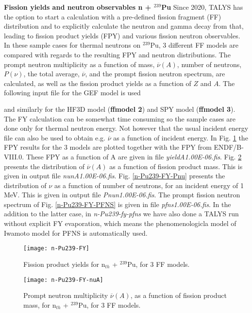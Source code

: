 \begin{samplecase}
{\bf Fission yields and neutron observables n + ${}^{239}$Pu}\newline
Since 2020, TALYS has the option to start a calculation with a pre-defined fission fragment (FF) distribution and to explicitly 
calculate the neutron and gamma decay from that, leading to fission product yields (FPY) and various fission neutron observables. 
In these sample cases for thermal neutrons on ${}^{239}$Pu, 3 different FF models are compared with regards to the resulting 
FPY and neutron distributions. The prompt neutron multiplicity as a function of mass, 
$\overline{\nu}(A)$, number of neutrons, $P({\nu})$, the total average,
$\overline{\nu}$, and the prompt fission neutron spectrum,
are calculated, as well as the fission product yields as a 
function of $Z$ and $A$.
The following input file for the GEF model is used


and similarly for the HF3D model ({\bf ffmodel 2}) and SPY model ({\bf ffmodel 3}).
The FY calculation can be somewhat time consuming so the sample cases are done only for thermal neutron energy. Not however that the usual incident energy file can also be used to obtain e.g. $\overline{\nu}$ as a function of incident energy.
In Fig. \ref{n-Pu239-FY} the FPY results for the 3 models are plotted together with the FPY from ENDF/B-VIII.0. These FPY as a function of A are given in file {\it yieldA1.00E-06.fis}.
Fig. \ref{n-Pu239-FY-nuA} presents the distribution of $\overline{\nu}(A)$ as a function of fission product mass. This is given in output 
file {\it nunA1.00E-06.fis}.
Fig. \ref{n-Pu239-FY-Pnu} presents the distribution of $\nu$ as a function of number of neutrons, for an incident energy of 1 MeV. This is given in output 
file {\it Pnun1.00E-06.fis}.
The prompt fission neutron spectrum of Fig. \ref{n-Pu239-FY-PFNS} is given in file {\it pfns1.00E-06.fis}.
In the addition to the latter case, in {\it n-Pu239-fy-pfns} we have also done a TALYS run without explicit FY evaporation, 
which means the phenomenologicla model of Iwamoto model for PFNS is automatically used.
\end{samplecase}
\begin{figure}
\centering\texttt{[image: n-Pu239-FY]}
\caption{Fission product yields for  n$_{th}$ + $^{239}$Pu, for 3 FF models.}
\label{n-Pu239-FY}
\end{figure}
\begin{figure}
\centering\texttt{[image: n-Pu239-FY-nuA]}
\caption{Prompt neutron multiplicity $\overline{\nu}(A)$, as a function of fission product mass, for n$_{th}$ + $^{239}$Pu, for 3 FF models.}
\label{n-Pu239-FY-nuA}
\end{figure}
